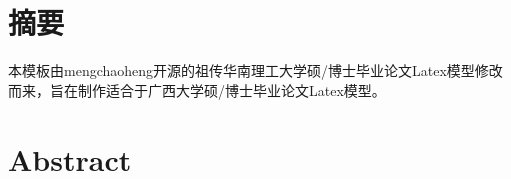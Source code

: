 \chapter{摘\texorpdfstring{\quad}{}要}
	本模板由mengchaoheng\cite{_}开源的祖传华南理工大学硕/博士毕业论文Latex模型修改而来，旨在制作适合于广西大学硕/博士毕业论文Latex模型。


\chapter{Abstract}
	

